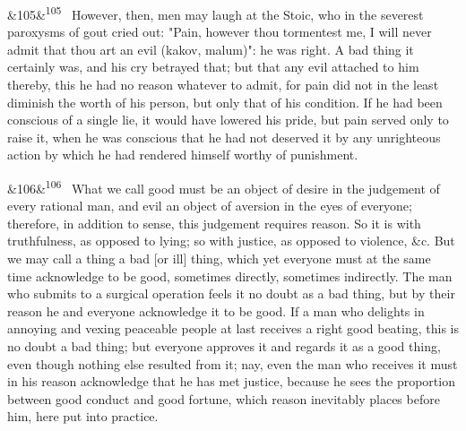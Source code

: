 \documentclass[12pt]{article}
\newcommand{\para}[1][]{\par\noindent\ifx&#1&\else\textsuperscript{\footnotesize #1}~\fi}
\begin{document}
\para[105] However, then, men may laugh at the Stoic, who in the severest paroxysms of gout cried out: "Pain, however thou tormentest me, I will never admit that thou art an evil (kakov, malum)": he was right. A bad thing it certainly was, and his cry betrayed that; but that any evil attached to him thereby, this he had no reason whatever to admit, for pain did not in the least diminish the worth of his person, but only that of his condition. If he had been conscious of a single lie, it would have lowered his pride, but pain served only to raise it, when he was conscious that he had not deserved it by any unrighteous action by which he had rendered himself worthy of punishment.

\para[106] What we call good must be an object of desire in the judgement of every rational man, and evil an object of aversion in the eyes of everyone; therefore, in addition to sense, this judgement requires reason. So it is with truthfulness, as opposed to lying; so with justice, as opposed to violence, \&c. But we may call a thing a bad [or ill] thing, which yet everyone must at the same time acknowledge to be good, sometimes directly, sometimes indirectly. The man who submits to a surgical operation feels it no doubt as a bad thing, but by their reason he and everyone acknowledge it to be good. If a man who delights in annoying and vexing peaceable people at last receives a right good beating, this is no doubt a bad thing; but everyone approves it and regards it as a good thing, even though nothing else resulted from it; nay, even the man who receives it must in his reason acknowledge that he has met justice, because he sees the proportion between good conduct and good fortune, which reason inevitably places before him, here put into practice.
\end{document}
